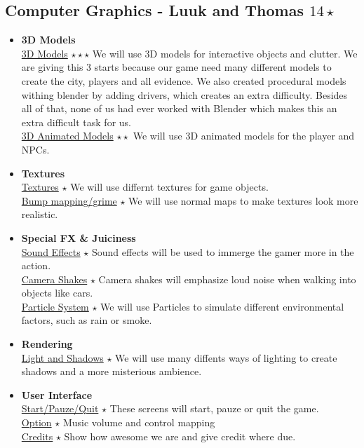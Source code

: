 \documentclass{article}
\begin{document}
		\subsection{Computer Graphics - Luuk and Thomas $14 \star$}
			\begin{itemize}
				\item \textbf{3D Models}\\
					\underline{3D Models} $\star \star \star$ We will use 3D models for interactive objects and clutter. We are giving this 3 starts because our game need many different models to create the city, players and all evidence. We also created procedural models withing blender by adding drivers, which creates an extra difficulty. Besides all of that, none of us had ever worked with Blender which makes this an extra difficult task for us.\\
					\underline{3D Animated Models} $\star \star$  We will use 3D animated models for the player and NPCs.\\
				\item \textbf{Textures}\\
					\underline{Textures} $\star$ We will use differnt textures for game objects.\\
					\underline{Bump mapping/grime} $\star $ We will use normal maps to make textures look more realistic.\\
				\item \textbf{Special FX \& Juiciness}\\
					\underline{Sound Effects} $\star$ Sound effects will be used to immerge the gamer more in the action.\\
					\underline{Camera Shakes} $\star$ Camera shakes will emphasize loud noise when walking into objects like cars.\\
					\underline{Particle System} $\star$ We will use Particles to simulate different environmental factors, such as rain or smoke.
				\item \textbf{Rendering}\\
					\underline{Light and Shadows} $\star$  We will use many diffents ways of lighting to create shadows and a more misterious ambience.\\
				\item \textbf{User Interface}\\
					\underline{Start/Pauze/Quit} $\star$ These screens will start, pauze or quit the game.\\
					\underline{Option} $\star$ Music volume and control mapping\\
					\underline{Credits} $\star$ Show how awesome we are and give credit where due.
			\end{itemize}
\end{document}
